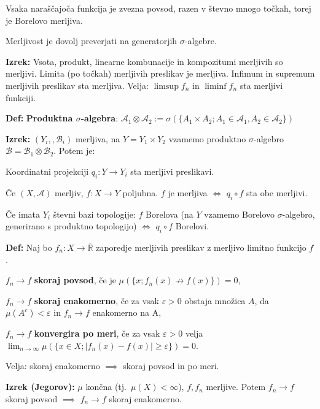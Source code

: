 \documentclass[a4paper,oneside,10pt]{article}
\theoremstyle{definition}
\newcommand{\Rbar}{\ensuremath{\bar{\mathbb{R}}}}
\newenvironment{itemize*}{\vspace{-10pt}\begin{itemize}\setlength{\itemsep}{0pt}\setlength{\parskip}{2pt}}{\end{itemize}}
\newcommand{\A}{\ensuremath{\mathcal{A}}}
\newcommand{\B}{\ensuremath{\mathcal{B}}}
\begin{document}
Vsaka naraščajoča funkcija je zvezna povsod, razen v števno mnogo točkah, torej
je Borelovo merljiva.

Merljivost je dovolj preverjati na generatorjih $\sigma$-algebre.

\textbf{Izrek:} Vsota, produkt, linearne kombunacije in kompozitumi merljivih so
merljivi.  Limita (po točkah) merljivih preslikav je merljiva. Infimum in
supremum merljivih preslikav sta merljiva. Velja: $\limsup f_n$ in $\liminf f_n$
sta merljivi funkciji.

\textbf{Def:} \textbf{Produktna $\sigma$-algebra}: $\A_1 \otimes \A_2 :=
\sigma(\{ A_1 \times A_2; A_1 \in \A_1, A_2 \in \A_2 \})$

\textbf{Izrek:} $(Y_i,, \B_i)$ merljiva, na $Y = Y_1 \times Y_2$ vzamemo
produktno $\sigma$-algebro $\B = \B_1 \otimes \B_2$. Potem je:
\begin{itemize*}
  \item Koordinatni projekciji $q_i \colon Y \to Y_i$ sta merljivi preslikavi.
  \item Če $(X, \A)$ merljiv, $f \colon X \to Y$ poljubna. $f$ je merljiva
    $\iff$ $q_i \circ f$ sta obe merljivi.
  \item Če imata $Y_i$ števni bazi topologije: $f$ Borelova (na $Y$ vzamemo
    Borelovo $\sigma$-algebro, generirano s produktno topologijo) $\iff$ $q_i
    \circ f$ Borelovi.
\end{itemize*}

\textbf{Def:} Naj bo $f_n\colon X\to\Rbar$ zaporedje merljivih preslikav z
merljivo limitno funkcijo $f$.
\begin{itemize*}
  \item $f_n \to f$ \textbf{skoraj povsod}, če je $\mu(\{x; f_n(x) \not\to f(x) \}) = 0$,
  \item $f_n \to f$ \textbf{skoraj enakomerno}, če za vsak $\varepsilon > 0$ obstaja množica
    $A$, da $\mu(A^c) < \varepsilon$ in $f_n\to f$ enakomerno na A,
  \item $f_n \to f$ \textbf{konvergira po meri}, če za vsak $\varepsilon > 0$ velja
    $\lim_{n\to\infty} \mu(\{ x \in X; \left|f_n(x) - f(x)\right| \geq \varepsilon \}) = 0$.
\end{itemize*}

Velja: skoraj enakomerno $\implies$ skoraj povsod in po meri.

\textbf{Izrek (Jegorov):} $\mu$ končna (tj.\ $\mu(X) < \infty$), $f,f_n$ merljive.
Potem $f_n \to f$ skoraj povsod $\implies$ $f_n \to f$ skoraj enakomerno.
\end{document}
